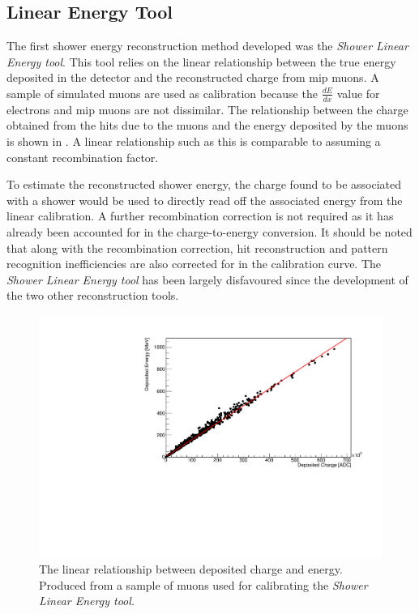 \subsection{Linear Energy Tool}\label{subchap:Linear Energy Tool}
The first shower energy reconstruction method developed was the \textit{Shower Linear Energy tool}. This tool relies on the linear relationship between the true energy deposited in the detector and the reconstructed charge from \gls{mip} muons. A sample of simulated muons are used as calibration because the $\frac{dE}{dx}$ value for electrons and \Gls{mip} muons are not dissimilar. The relationship between the charge obtained from the hits due to the muons and the energy deposited by the muons is shown in . A linear relationship such as this is comparable to assuming a constant recombination factor. 


To estimate the reconstructed shower energy, the charge found to be associated with a shower would be used to directly read off the associated energy from the linear calibration. A further recombination correction is not required as it has already been accounted for in the charge-to-energy conversion. It should be noted that along with the recombination correction, hit reconstruction and pattern recognition inefficiencies are also corrected for in the calibration curve.  The \textit{Shower Linear Energy tool} has been largely disfavoured since the development of the two other reconstruction tools. 

\begin{figure}[h!]
    \centering
    \includegraphics[width = \largefigwidth]{figures-chap4/linear_tool_lookup_curve.pdf}
    \caption{The linear relationship between deposited charge and energy. Produced from a sample of muons used for calibrating the \textit{Shower Linear Energy tool.}}
    \label{fig:linear lookup curve}
\end{figure}

